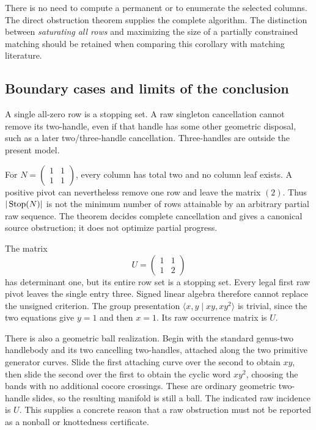 There is no need to compute a permanent or to enumerate the selected
columns. The direct obstruction theorem supplies the complete algorithm.
The distinction between \emph{saturating all rows} and maximizing the
size of a partially constrained matching should be retained when comparing
this corollary with matching literature.

\subsection{Boundary cases and limits of the conclusion}

\begin{example}
A single all-zero row is a stopping set. A raw singleton cancellation
cannot remove its two-handle, even if that handle has some other geometric
disposal, such as a later two/three-handle cancellation. Three-handles are
outside the present model.
\end{example}

\begin{example}
For
$N=\left(\begin{smallmatrix}1&1\\1&1\end{smallmatrix}\right)$, every
column has total two and no column leaf exists. A positive pivot can
nevertheless remove one row and leave the matrix $(2)$. Thus
$|\operatorname{Stop}(N)|$ is not the minimum number of rows attainable by an arbitrary
partial raw sequence. The theorem decides complete cancellation and gives
a canonical source obstruction; it does not optimize partial progress.
\end{example}

\begin{example}\label{ex:unimodular}
The matrix
\[
 U=\begin{pmatrix}1&1\\1&2\end{pmatrix}
\]
has determinant one, but its entire row set is a stopping set. Every legal
first raw pivot leaves the single entry three. Signed linear algebra
therefore cannot replace the unsigned criterion. The group presentation
$\langle x,y\mid xy,xy^2\rangle$ is trivial, since the two equations give
$y=1$ and then $x=1$. Its raw occurrence matrix is $U$.

There is also a geometric ball realization. Begin with the standard
genus-two handlebody and its two cancelling two-handles, attached along
the two primitive generator curves. Slide the first attaching curve over
the second to obtain $xy$, then slide the second over the first to obtain
the cyclic word $xy^2$, choosing the bands with no additional cocore crossings. These are
ordinary geometric two-handle slides, so the resulting manifold is still
a ball. The indicated raw incidence is $U$. This supplies a concrete
reason that a raw obstruction must not be reported as a nonball or
knottedness certificate.
\end{example}
